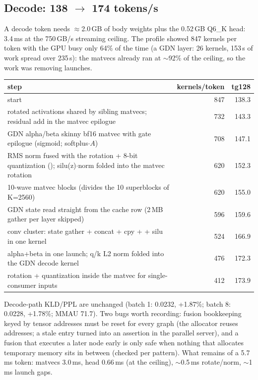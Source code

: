 \documentclass[10pt,a4paper]{article}
\newcommand{\tx}[1]{\texttt{\detokenize{#1}}}
\begin{document}
\subsection{Decode: 138 $\to$ 174 tokens/s}
A decode token needs $\approx$2.0\,GB of body weights plus the 0.52\,GB Q6\_K head: 3.4\,ms at the 750\,GB/s streaming ceiling. The profile showed 847
kernels per token with the GPU busy only 64\% of the time (a GDN layer: 26 kernels, 153\,\textmu s of work spread over 235\,\textmu s): the matvecs
already ran at $\sim$92\% of the ceiling, so the work was removing launches.
\begin{center}\small
\begin{tabular}{@{}p{10.5cm}rr@{}}
\toprule
step & kernels/token & tg128\\
\midrule
start & 847 & 138.3\\
rotated activations shared by sibling matvecs; residual add in the matvec epilogue & 732 & 143.3\\
GDN alpha/beta skinny bf16 matvec with gate epilogue (sigmoid; softplus$\cdot A$) & 708 & 147.1\\
RMS norm fused with the rotation + 8-bit quantization (\tx{k_rmsnorm_rot_q8x}); silu(z)$\cdot$norm folded into the matvec rotation & 620 & 152.3\\
10-wave matvec blocks (divides the 10 superblocks of K=2560) & 620 & 155.0\\
GDN state read straight from the cache row (2\,MB gather per layer skipped) & 596 & 159.6\\
conv cluster: state gather + concat + cpy + \tx{ssm_conv} + silu in one kernel & 524 & 166.9\\
alpha+beta in one launch; q/k L2 norm folded into the GDN decode kernel & 476 & 172.3\\
rotation + quantization inside the matvec for single-consumer inputs & 412 & 173.9\\
\bottomrule
\end{tabular}
\end{center}
Decode-path KLD/PPL are unchanged (batch 1: 0.0232, +1.87\%; batch 8: 0.0228, +1.78\%; MMAU 71.7). Two bugs worth recording: fusion bookkeeping keyed by tensor
addresses must be reset for every graph (the allocator reuses addresses; a stale entry turned into an assertion in the parallel server), and a fusion that executes a
later node early is only safe when nothing that allocates temporary memory sits in between (checked per pattern). What remains of a 5.7\,ms token:
matvecs 3.0\,ms, head 0.66\,ms (at the ceiling), $\sim$0.5\,ms rotate/norm, $\sim$1\,ms launch gaps.
\end{document}
